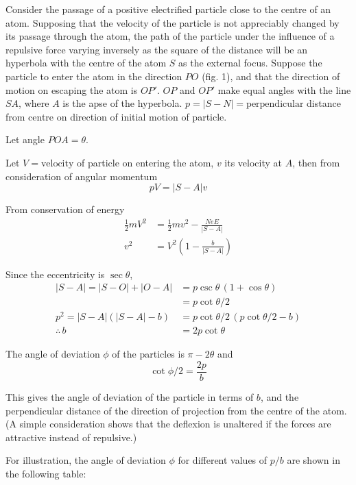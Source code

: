 \documentclass{article}
\begin{document}
\bigskip
Consider the passage of a positive electrified particle close to the centre of an atom.
Supposing that the velocity of the particle is not appreciably changed by its passage through the atom,
the path of the particle under the influence of a repulsive force varying inversely as the square of the
distance will be an hyperbola with the centre of the atom $S$ as the external focus.
Suppose the particle to enter the atom in the direction $PO$ (fig. 1),
and that the direction of motion
on escaping the atom is $OP'$.
$OP$ and $OP'$ make equal angles with the line $SA$,
where $A$ is the apse of the hyperbola.
$p=|S-N|=\text{perpendicular}$ distance from centre on direction of initial motion of particle.

\bigskip
Let angle $POA=\theta$.

\bigskip
Let $V=\text{velocity}$ of particle on entering the atom, $v$ its velocity at $A$,
then from consideration of angular momentum
\begin{equation*}
pV=|S-A|v
\end{equation*}

From conservation of energy
\begin{align*}
\tfrac{1}{2}mV^2&=\tfrac{1}{2}mv^2-\frac{NeE}{|S-A|}
\\
v^2&=V^2\left(1-\frac{b}{|S-A|}\right)
\end{align*}

Since the eccentricity is $\sec\theta$,
\begin{align*}
|S-A|=|S-O|+|O-A|&=p\csc\theta\,(1+\cos\theta)
\\
&=p\cot\theta/2
\\
p^2=|S-A|(|S-A|-b)&=p\cot\theta/2\,(p\cot\theta/2-b)
\\
\therefore\,b&=2p\cot\theta
\end{align*}

The angle of deviation $\phi$ of the particles is $\pi-2\theta$ and
\begin{equation*}
\cot\phi/2=\frac{2p}{b}
\tag{1}
\end{equation*}

This gives the angle of deviation of the particle in terms of $b$,
and the perpendicular distance of the direction of projection from the centre of the atom.
(A simple consideration shows that the deflexion is unaltered if the forces are attractive instead of repulsive.)

\bigskip
For illustration, the angle of deviation $\phi$ for different values of $p/b$ are shown in the following table:
\end{document}
